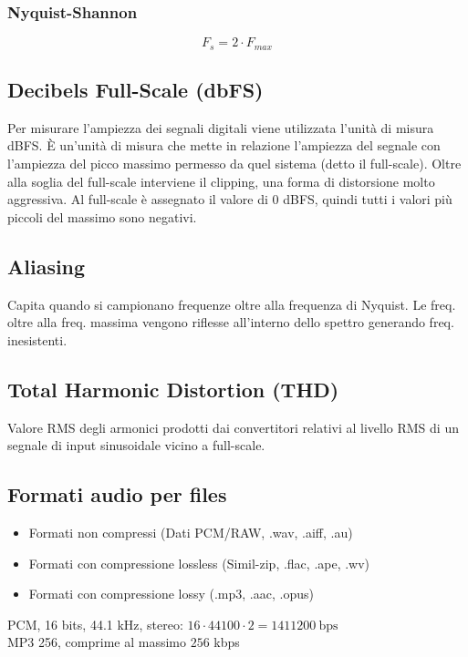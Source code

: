 \documentclass[8pt,a4paper]{article}
\begin{document}
\begin{multicols}{5}
    \subsubsection{Nyquist-Shannon}
    \begin{equation*}
      F_s = 2 \cdot F_{max}
    \end{equation*}
    

    \subsection{Decibels Full-Scale (dbFS)}
    Per misurare l’ampiezza dei segnali digitali viene utilizzata l’unità di misura
    dBFS. È un’unità di misura che mette in relazione l'ampiezza del segnale con 
    l’ampiezza del picco massimo permesso da quel sistema (detto il full-scale). Oltre 
    alla soglia del full-scale interviene il clipping, una forma di distorsione molto 
    aggressiva. Al full-scale è assegnato il valore di 0 dBFS, quindi tutti i valori 
    più piccoli del massimo sono negativi.

    \subsection{Aliasing}
    Capita quando si campionano frequenze oltre alla frequenza di Nyquist.
    Le freq. oltre alla freq. massima vengono riflesse all'interno dello spettro
    generando freq. inesistenti.

    \subsection{Total Harmonic Distortion (THD)}
    Valore RMS degli armonici prodotti dai convertitori relativi al livello RMS di
    un segnale di input sinusoidale vicino a full-scale.

    \subsection{Formati audio per files}
    \begin{itemize}
      \item Formati non compressi (Dati PCM/RAW, .wav, .aiff, .au) 
      \item Formati con compressione lossless (Simil-zip, .flac, .ape, .wv)
      \item Formati con compressione lossy (.mp3, .aac, .opus)
    \end{itemize}
    \noindent
    PCM, 16 bits, 44.1 kHz, stereo: $16 \cdot 44100 \cdot 2 = 1411200\ \text{bps}$\\
    MP3 256, comprime al massimo $256$ kbps


\end{multicols}
\end{document}

